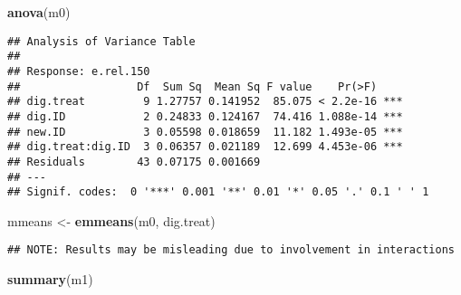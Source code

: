 \documentclass[
]{article}
\newenvironment{Shaded}{\begin{snugshade}}{\end{snugshade}}
\newcommand{\FunctionTok}[1]{\textcolor[rgb]{0.13,0.29,0.53}{\textbf{#1}}}
\newcommand{\NormalTok}[1]{#1}
\newcommand{\OtherTok}[1]{\textcolor[rgb]{0.56,0.35,0.01}{#1}}
\newcommand{\StringTok}[1]{\textcolor[rgb]{0.31,0.60,0.02}{#1}}
\begin{document}
\begin{Shaded}
\begin{Highlighting}[]
\FunctionTok{anova}\NormalTok{(m0)}
\end{Highlighting}
\end{Shaded}

\begin{verbatim}
## Analysis of Variance Table
## 
## Response: e.rel.150
##                  Df  Sum Sq  Mean Sq F value    Pr(>F)    
## dig.treat         9 1.27757 0.141952  85.075 < 2.2e-16 ***
## dig.ID            2 0.24833 0.124167  74.416 1.088e-14 ***
## new.ID            3 0.05598 0.018659  11.182 1.493e-05 ***
## dig.treat:dig.ID  3 0.06357 0.021189  12.699 4.453e-06 ***
## Residuals        43 0.07175 0.001669                      
## ---
## Signif. codes:  0 '***' 0.001 '**' 0.01 '*' 0.05 '.' 0.1 ' ' 1
\end{verbatim}

\begin{Shaded}
\begin{Highlighting}[]
\NormalTok{mmeans }\OtherTok{\textless{}{-}} \FunctionTok{emmeans}\NormalTok{(m0, }\StringTok{\textquotesingle{}dig.treat\textquotesingle{}}\NormalTok{)}
\end{Highlighting}
\end{Shaded}

\begin{verbatim}
## NOTE: Results may be misleading due to involvement in interactions
\end{verbatim}

\begin{Shaded}
\begin{Highlighting}[]
\FunctionTok{summary}\NormalTok{(m1)}
\end{Highlighting}
\end{Shaded}
\end{document}
